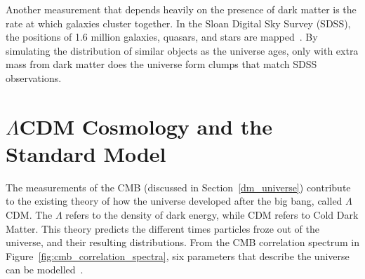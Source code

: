     Another measurement that depends heavily on the presence of dark matter is the rate at which galaxies cluster together.
    In the Sloan Digital Sky Survey (SDSS), the positions of 1.6 million galaxies, quasars, and stars are mapped~\cite{sdss_release}.
    By simulating the distribution of similar objects as the universe ages, only with extra mass from dark matter does the universe form clumps that match SDSS observations.
    
    

\section{$\Lambda$CDM Cosmology and the Standard Model}

  The measurements of the CMB (discussed in Section~\ref{dm_universe}) contribute to the existing theory of how the universe developed after the big bang, called $\Lambda$CDM.
  The $\Lambda$ refers to the density of dark energy, while CDM refers to Cold Dark Matter.
  This theory predicts the different times particles froze out of the universe, and their resulting distributions.
  From the CMB correlation spectrum in Figure~\ref{fig:cmb_correlation_spectra}, six parameters that describe the universe can be modelled~\cite{planck_dm_limit,planck_2013_parameters}.

  
